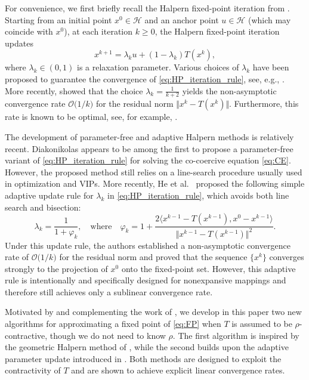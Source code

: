\documentclass{article}
\theoremstyle{plain}
\theoremstyle{definition}
\newcommand{\Hil}{\mathcal{H}}
\newcommand{\sets}[1]{\{#1\}}
\newcommand{\norms}[1]{\Vert#1\Vert}
\newcommand{\iprods}[1]{\langle #1\rangle}
\newcommand{\0}{\boldsymbol{0}}
\newcommand{\BigOs}[1]{\mathcal{O}\big(#1\big)}
\begin{document}
For convenience, we first briefly recall the Halpern fixed-point iteration from \cite{halpern1967fixed}.
Starting from an initial point $x^0 \in \Hil$ and an anchor point $u\in \Hil$ (which may coincide with $x^0$), at each iteration $k \geq 0$, the Halpern fixed-point iteration updates
\begin{equation}\label{eq:HP_iteration_rule}
x^{k+1} = \lambda_k u + (1-\lambda_k)T(x^k),
\end{equation}
where $\lambda_k \in (0, 1)$ is a relaxation parameter. Various choices of $\lambda_k$ have been proposed to guarantee the convergence of \eqref{eq:HP_iteration_rule}, see, e.g., \cite{he2024convergence}. 
More recently, \cite{lieder2021convergence,sabach2017first} showed that the choice $\lambda_k = \frac{1}{k+2}$ yields the non-asymptotic convergence rate $\BigOs{1/k}$ for the residual norm $\norms{x^k - T(x^k)}$. 
Furthermore, this rate is known to be optimal, see, for example, \cite{lieder2021convergence,park2022exact}.

The development of parameter-free and adaptive Halpern methods is relatively recent. 
Diakonikolas \cite{diakonikolas2020halpern} appears to be among the first to propose a parameter-free variant of \eqref{eq:HP_iteration_rule} for solving the co-coercive equation \eqref{eq:CE}. 
However, the proposed method still relies on a line-search procedure usually used in optimization and VIPs. 
More recently, He et al.~\cite{he2024convergence} proposed the following simple adaptive update rule for $\lambda_k$ in \eqref{eq:HP_iteration_rule}, which avoids both line search and bisection:
\begin{equation}\label{eq:adaptive_stepsize}
\lambda_k = \frac{1}{1+\varphi_k}, \quad\text{where} \quad \varphi_k = 1 + \frac{2\iprods{x^{k-1} - T(x^{k-1}), x^0 - x^{k-1}}}{\norms{x^{k-1} - T(x^{k-1})}^2}.
\end{equation}
Under this update rule, the authors established a non-asymptotic convergence rate of $\BigOs{1/k}$ for the residual norm and proved that the sequence $\sets{x^k}$ converges strongly to the projection of $x^0$ onto the fixed-point set. 
However, this adaptive rule is intentionally and specifically designed for nonexpansive mappings and therefore still achieves only a sublinear convergence rate.

Motivated by and complementing the work of \cite{diakonikolas2020halpern,he2024convergence}, we develop in this paper two new algorithms for approximating a fixed point of \eqref{eq:FP} when $T$ is assumed to be $\rho$-contractive, though we do not need to know $\rho$. 
The first algorithm is inspired by the geometric Halpern method of \cite{park2022exact}, while the second builds upon the adaptive parameter update introduced in \cite{he2024convergence}. 
Both methods are designed to exploit the contractivity of $T$ and are shown to achieve explicit linear convergence rates.
\end{document}
